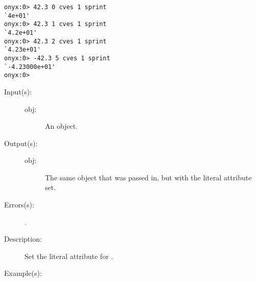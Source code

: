 \begin{description}
\begin{description}
\begin{verbatim}
onyx:0> 42.3 0 cves 1 sprint
`4e+01'
onyx:0> 42.3 1 cves 1 sprint
`4.2e+01'
onyx:0> 42.3 2 cves 1 sprint
`4.23e+01'
onyx:0> -42.3 5 cves 1 sprint
`-4.23000e+01'
onyx:0>
		\end{verbatim}
	\end{description}
\label{systemdict:cvlit}
\item[{\onyxop{obj}{cvlit}{obj}}: ]
	\begin{description}\item[]
	\item[Input(s): ]
		\begin{description}\item[]
		\item[obj: ]
			An object.
		\end{description}
	\item[Output(s): ]
		\begin{description}\item[]
		\item[obj: ]
			The same object that was passed in, but with the literal
			attribute set.
		\end{description}
	\item[Errors(s): ]
		\begin{description}\item[]
		\item[.]
		\end{description}
	\item[Description: ]
		Set the literal attribute for .
	\item[Example(s): ]\begin{verbatim}


\end{verbatim}
\end{description}
\end{description}
